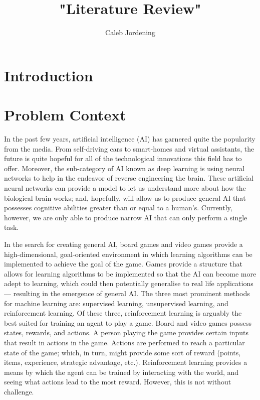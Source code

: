 \documentclass[10pt,twocolumn]{article}
\title{"Literature Review"}
\author{Caleb Jordening}
\affiliation{Occidental College}
\begin{document}
\maketitle

\begin{abstract}
    
\end{abstract}

\section{Introduction}
\section {Problem Context}
In the past few years, artificial intelligence (AI) has garnered quite the popularity from the media. From self-driving cars to smart-homes and virtual assistants, the future is quite hopeful for all of the technological innovations this field has to offer. Moreover, the sub-category of AI known as deep learning is using neural networks to help in the endeavor of reverse engineering the brain. These artificial neural networks can provide a model to let us understand more about how the biological brain works; and, hopefully, will allow us to produce general AI that possesses cognitive abilities greater than or equal to a human's. Currently, however, we are only able to produce narrow AI that can only perform a single task. 

In the search for creating general AI, board games and video games provide a high-dimensional, goal-oriented environment in which learning algorithms can be implemented to achieve the goal of the game. Games provide a structure that allows for learning algorithms to be implemented so that the AI can become more adept to learning, which could then potentially generalise to real life applications — resulting in the emergence of general AI. The three most prominent methods for machine learning are: supervised learning, unsupervised learning, and reinforcement learning. Of these three, reinforcement learning is arguably the best suited for training an agent to play a game. Board and video games possess states, rewards, and actions. A person playing the game provides certain inputs that result in actions in the game. Actions are performed to reach a particular state of the game; which, in turn, might provide some sort of reward (points, items, experience, strategic advantage, etc.). Reinforcement learning provides a means by which the agent can be trained by interacting with the world, and seeing what actions lead to the most reward. However, this is not without challenge.
\end{document}
